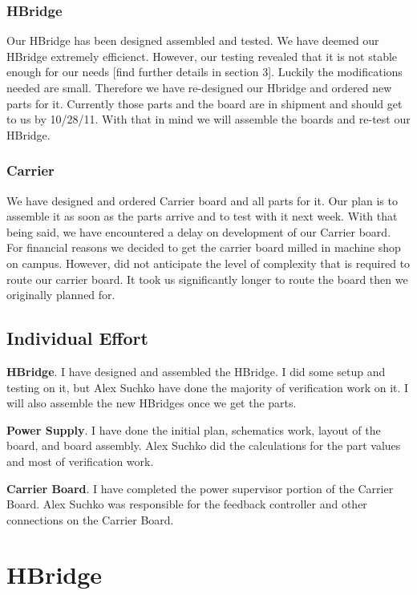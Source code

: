 \documentclass[12pt]{article}
\begin{document}
\subsubsection{HBridge}
Our HBridge has been designed assembled and tested. We have deemed our HBridge extremely efficienct. However, our testing revealed that it is not stable enough for our needs [find further details in section 3]. Luckily the modifications needed are small. Therefore we have re-designed our Hbridge and ordered new parts for it. Currently those parts and the board are in shipment and should get to us by 10/28/11. With that in mind we will assemble the boards and re-test our HBridge. 
\subsubsection{Carrier}
We have designed and ordered Carrier board and all parts for it. Our plan is to assemble it as soon as the parts arrive and to test with it next week. With that being said, we have encountered a delay on development of our Carrier board. For financial reasons we decided to get the carrier board milled in machine shop on campus. However, did not anticipate the level of complexity that is required to route our carrier board. It took us significantly longer to route the board then we originally planned for.
\subsection{Individual Effort}
 \begin{description}
  \item{\bf HBridge}. I have designed and assembled the HBridge. I did some setup and testing on it, but Alex Suchko have done the majority of verification work on it. I will also assemble the new HBridges once we get the parts. 
  \item{\bf Power Supply}. I  have done the initial plan, schematics work, layout of the board, and board assembly. Alex Suchko did the calculations for the part values and most of verification work. 
  \item{\bf Carrier Board}. I have completed the power supervisor portion of the Carrier Board. Alex Suchko was responsible for the feedback controller and other connections on the Carrier Board.
\end{description}


\newpage
\section{HBridge}
\end{document}
